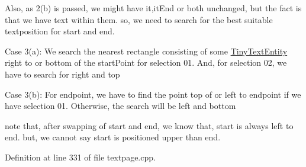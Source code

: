 Also, as 2(b) is passed, we might have it,it\+End or both unchanged, but the fact is that we have text within them. so, we need to search for the best suitable textposition for start and end.

Case 3(a)\+: We search the nearest rectangle consisting of some \hyperlink{classTinyTextEntity}{Tiny\+Text\+Entity} right to or bottom of the start\+Point for selection 01. And, for selection 02, we have to search for right and top

Case 3(b)\+: For endpoint, we have to find the point top of or left to endpoint if we have selection 01. Otherwise, the search will be left and bottom

note that, after swapping of start and end, we know that, start is always left to end. but, we cannot say start is positioned upper than end.

Definition at line 331 of file textpage.\+cpp.


